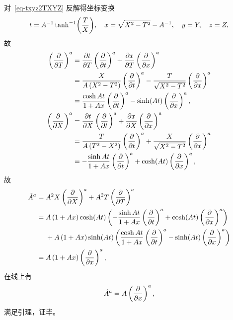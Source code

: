 \begin{xiti}
\begin{zm}
\begin{enumerate}[label=(\alph*)]
				对~\eqref{eq-txyz2TXYZ} 反解得坐标变换
				\begin{equation*}
					t = A^{-1} \tanh[-1](\frac{T}{X}) \qc x = \sqrt{X^2 - T^2} - A^{-1} \qc y = Y \qc z = Z,
				\end{equation*}
				故
				\begin{equation*}
					\begin{split}
						\tensor{\left( \pdv{T} \right)}{^a} &= \pdv{t}{T} \tensor{\left( \pdv{t} \right)}{^a} + \pdv{x}{T} \tensor{\left( \pdv{x} \right)}{^a}\\
						&= \frac{X}{A\left( X^2 - T^2 \right)} \tensor{\left( \pdv{t} \right)}{^a} - \frac{T}{\sqrt{X^2 - T^2}} \tensor{\left( \pdv{x} \right)}{^a}\\
						&= \frac{\cosh At}{1+Ax} \tensor{\left( \pdv{t} \right)}{^a} - \sinh(At) \tensor{\left( \pdv{x} \right)}{^a},\\
						\tensor{\left( \pdv{X} \right)}{^a} &= \pdv{t}{X} \tensor{\left( \pdv{t} \right)}{^a} + \pdv{x}{X} \tensor{\left( \pdv{x} \right)}{^a}\\
						&= \frac{T}{A\left( T^2 - X^2 \right)} \tensor{\left( \pdv{t} \right)}{^a} + \frac{X}{\sqrt{X^2 - T^2}} \tensor{\left( \pdv{x} \right)}{^a}\\
						&= - \frac{\sinh At}{1+Ax} \tensor{\left( \pdv{t} \right)}{^a} + \cosh(At) \tensor{\left( \pdv{x} \right)}{^a},
					\end{split}
				\end{equation*}
				故
				\begin{equation*}
					\begin{split}
						\tensor{\hat{A}}{^a} ={}& A^2 X \tensor{\left( \pdv{X} \right)}{^a} + A^2 T \tensor{\left( \pdv{T} \right)}{^a}\\
						={}& A \left( 1 + A x \right) \cosh(At) \left( - \frac{\sinh At}{1+Ax} \tensor{\left( \pdv{t} \right)}{^a} + \cosh(At) \tensor{\left( \pdv{x} \right)}{^a} \right)\\
						&{} + A\left( 1+Ax \right) \sinh(At) \left( \frac{\cosh At}{1+Ax} \tensor{\left( \pdv{t} \right)}{^a} - \sinh(At) \tensor{\left( \pdv{x} \right)}{^a} \right)\\
						={}& A \left( 1+ Ax \right) \tensor{\left( \pdv{x} \right)}{^a},
					\end{split}
				\end{equation*}
				在线上有
				\begin{equation*}
					\tensor{\hat{A}}{^a} = A \tensor{\left( \pdv{x} \right)}{^a},
				\end{equation*}
				满足引理，证毕。
			\end{enumerate}
		\end{zm}


\end{xiti}
